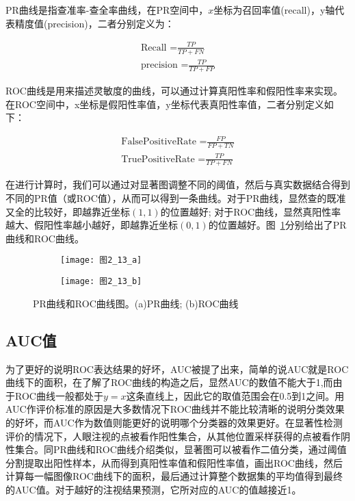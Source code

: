 PR曲线是指查准率-查全率曲线，在PR空间中，$x$坐标为召回率值(recall)，y轴代表精度值(precision)，二者分别定义为：
\begin{linenomath}
\begin{align}
\textrm{Recall =$\frac{TP}{TP+FN}$}\label{式2_38}\\
\textrm{precision =$\frac{TP}{TP+FP}$}\label{式2_39}
\end{align}
\end{linenomath}

ROC曲线是用来描述灵敏度的曲线，可以通过计算真阳性率和假阳性率来实现。在ROC空间中，x坐标是假阳性率值，y坐标代表真阳性率值，二者分别定义如下：
\begin{linenomath}
\begin{align}
\textrm{FalsePositiveRate =$\frac{FP}{FP+TN}$}\label{式2_40}\\
\textrm{TruePositiveRate =$\frac{TP}{TP+FN}$}\label{式2_41}
\end{align}
\end{linenomath}

在进行计算时，我们可以通过对显著图调整不同的阈值，然后与真实数据结合得到不同的PR值（或ROC值），从而可以得到一条曲线。对于PR曲线，显然查的既准又全的比较好，即越靠近坐标$(1,1)$的位置越好; 对于ROC曲线，显然真阳性率越大、假阳性率越小越好，即越靠近坐标$(0,1)$的位置越好。图~\ref{图2_13}分别给出了PR曲线和ROC曲线。
\begin{figure}[h]
  \centering%
  \begin{subfigure}{0.4\textwidth}
    \texttt{[image: 图2\_13\_a]}
    \caption{}
  \end{subfigure}
  \hspace{4em}%
  \begin{subfigure}{0.4\textwidth}
    \texttt{[image: 图2\_13\_b]}
    \caption{}
  \end{subfigure}
  \caption{PR曲线和ROC曲线图。(a)PR曲线; (b)ROC曲线}
  \label{图2_13}
\end{figure}

\subsection{AUC值}
\label{2_5_2}

为了更好的说明ROC表达结果的好坏，AUC被提了出来，简单的说AUC就是ROC曲线下的面积\cite{Green1966book}，在了解了ROC曲线的构造之后，显然AUC的数值不能大于1,而由于ROC曲线一般都处于$y=x$这条直线上，因此它的取值范围会在0.5到1之间。用AUC作评价标准的原因是大多数情况下ROC曲线并不能比较清晰的说明分类效果的好坏，而AUC作为数值则能更好的说明哪个分类器的效果更好。在显著性检测评价的情况下，人眼注视的点被看作阳性集合，从其他位置采样获得的点被看作阴性集合\cite{Tatler2005correlates}。同PR曲线和ROC曲线介绍类似，显著图可以被看作二值分类，通过阈值分割提取出阳性样本，从而得到真阳性率值和假阳性率值，画出ROC曲线，然后计算每一幅图像ROC曲线下的面积，最后通过计算整个数据集的平均值得到最终的AUC值。对于越好的注视结果预测，它所对应的AUC的值越接近1。

